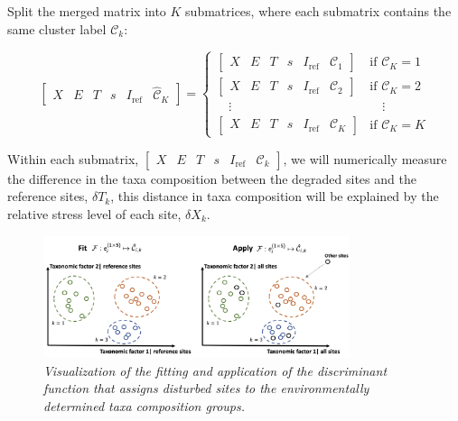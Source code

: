 Split the merged matrix into \(K\) submatrices, where each submatrix contains the same cluster label \(\mathcal{C}_k\):

\[
\left[
\begin{array}{cccccc}
X & E & T & s & I_{\text{ref}} & \mathcal{\hat C}_K
\end{array}
\right]
=
\left\{
\begin{array}{ll}
\left[
\begin{array}{cccccc}
X & E & T & s & I_{\text{ref}} & \mathcal{C}_1
\end{array}
\right] & \text{if } \mathcal{C}_K = 1 \\[1.2em]
\left[
\begin{array}{cccccc}
X & E & T & s & I_{\text{ref}} & \mathcal{C}_2
\end{array}
\right] & \text{if } \mathcal{C}_K = 2 \\[0.8em]
\quad\vdots & \quad
\vdots \\[0.8em]
\left[
\begin{array}{cccccc}
X & E & T & s & I_{\text{ref}} & \mathcal{C}_K
\end{array}
\right] & \text{if } \mathcal{C}_K = K
\end{array}
\right.
\]

Within each submatrix,
$
\left[
\begin{array}{cccccc}
X & E & T & s & I_{\text{ref}} & {\mathcal{C}_k}
\end{array}
\right]
$, we will numerically measure the difference in the taxa composition 
between the degraded sites and the reference sites,
$\delta T_k$, this distance in taxa composition will be explained by the 
relative stress level of each site, \(\delta X_k\).

\begin{figure}
\centering
\includegraphics[width=0.8\textwidth]{../presentation/figures/p12_fit_apply_discriminant_function.png}
\caption{\textit{Visualization of the fitting and application of the discriminant function that assigns disturbed sites to the environmentally determined taxa composition groups.
}}
\label{fig:p12_fit_apply_discriminant_function}
\end{figure}

